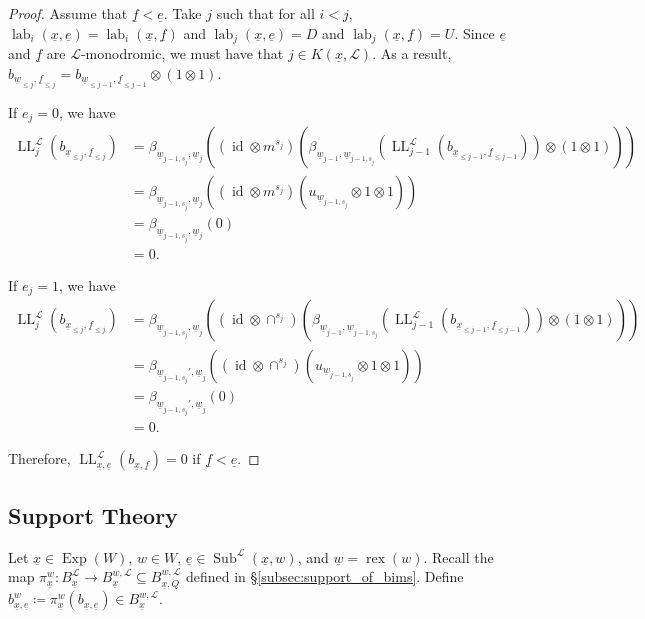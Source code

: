 \documentclass{amsart}
\newcommand{\scrL}{\mathcal{L}}
\DeclareMathOperator{\id}{id}
\DeclareMathOperator{\rex}{rex}
\DeclareMathOperator{\LL}{LL}
\DeclareMathOperator{\lab}{lab}
\DeclareMathOperator{\Exp}{Exp}
\DeclareMathOperator{\Subexp}{Sub}
\newcommand{\ue}{\underline{e}}
\newcommand{\uf}{\underline{f}}
\newcommand{\uw}{\underline{w}}
\newcommand{\ux}{\underline{x}}
\theoremstyle{definition}
\numberwithin{equation}{subsection}
\begin{document}
\begin{proof}
    Assume that $\uf < \ue$. Take $j$ such that for all $i < j$, $\lab_i (\ux, \ue) = \lab_i (\ux, \uf)$ and $\lab_j (\ux, \ue) = D$ and $\lab_j (\ux, \uf) = U$.
    Since $\ue$ and $\uf$ are $\scrL$-monodromic, we must have that $j \in K(\ux, \scrL)$. As a result, $b_{\uw_{\leq j}, \uf_{\leq j}} = b_{\uw_{\leq j-1}, \uf_{\leq j -1 }} \otimes (1 \otimes 1)$.

    If $e_j = 0$, we have
    \begin{align*}
        \LL_j^{\scrL} (b_{\ux_{\leq j}, \uf_{\leq j}}) &= \beta_{\uw_{j-1,s_j}, \uw_j} \left( (\id \otimes m^{s_j}) \left( \beta_{\uw_{j-1}, \uw_{j-1,s_j}} \left( \LL_{j-1}^{\scrL} (b_{\ux_{\leq j-1}, \uf_{\leq j-1}}) \right) \otimes (1 \otimes 1) \right) \right) \\
        &= \beta_{\uw_{j-1,s_j}, \uw_j} \left( (\id \otimes m^{s_j}) \left( u_{\uw_{j-1,s_j}} \otimes 1 \otimes 1 \right) \right) \\
        &= \beta_{\uw_{j-1,s_j}, \uw_j} \left( 0\right) \\
        &= 0.
    \end{align*}

    If $e_j = 1$, we have
    \begin{align*}
        \LL_j^{\scrL} (b_{\ux_{\leq j}, \uf_{\leq j}}) &= \beta_{\uw_{j-1,s_j}, \uw_j} \left( (\id \otimes \cap^{s_j}) \left( \beta_{\uw_{j-1}, \uw_{j-1,s_j}} \left( \LL_{j-1}^{\scrL} (b_{\ux_{\leq j-1}, \uf_{\leq j-1}}) \right) \otimes (1 \otimes 1) \right) \right) \\
        &= \beta_{\uw_{j-1,s_j}', \uw_j} \left( (\id \otimes \cap^{s_j}) \left( u_{\uw_{j-1,s_j}} \otimes 1 \otimes 1 \right) \right) \\
        &= \beta_{\uw_{j-1,s_j}', \uw_j} \left( 0\right) \\
        &= 0.
    \end{align*}

    Therefore, $\LL_{\ux, \ue}^{\scrL} (b_{\ux, \uf}) = 0$ if $\uf < \ue$.
\end{proof}

\subsection{Support Theory}\label{subsec:support_of_abe}

Let $\ux \in \Exp (W)$, $w \in W$, $\ue \in \Subexp^{\scrL} (\ux, w)$, and $\uw = \rex (w)$. 
Recall the map $\pi_{\ux}^w : B_{\ux}^{\scrL} \to B_{\ux}^{w, \scrL} \subseteq B_{\ux, Q}^{w, \scrL}$ defined in \S\ref{subsec:support_of_bims}.
Define $b_{\ux, \ue}^w \coloneq \pi_{\ux}^w (b_{\ux, \ue}) \in  B_{\ux}^{w, \scrL}$. 
\end{document}
